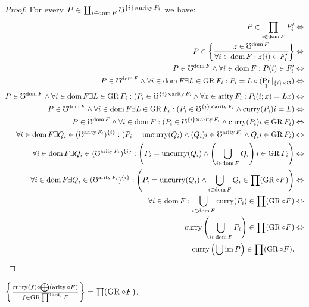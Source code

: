 \begin{proof}
For every $P\in\coprod_{i\in\operatorname{dom} F}\mho^{\{i\}\times\operatorname{arity} F_{i}}$
we have:
\begin{align*}
P\in\prod_{i\in\operatorname{dom} F}F'_{i} & \Leftrightarrow\\
P\in\left\{ \frac{z\in\mho^{\operatorname{dom} F}}{\forall i\in\operatorname{dom} F:z(i)\in F'_{i}}\right\} & \Leftrightarrow\\
P\in\mho^{\operatorname{dom} F}\land\forall i\in\operatorname{dom} F:P(i)\in F'_{i} & \Leftrightarrow\\
P\in\mho^{\operatorname{dom} F}\land\forall i\in\operatorname{dom} F\exists L\in\operatorname{GR} F_{i}:P_{i}=L\circ(\Pr_{1}|_{\{i\}\times\mho}) & \Leftrightarrow\\
P\in\mho^{\operatorname{dom} F}\land\forall i\in\operatorname{dom} F\exists L\in\operatorname{GR} F_{i}:(P_{i}\in\mho^{\{i\}\times\operatorname{arity} F_{i}}\land\forall x\in\operatorname{arity} F_{i}:P_{i}(i;x)=Lx) & \Leftrightarrow\\
P\in\mho^{\operatorname{dom} F}\land\forall i\in\operatorname{dom} F\exists L\in\operatorname{GR} F_{i}:(P_{i}\in\mho^{\{i\}\times\operatorname{arity} F_{i}}\land\operatorname{curry}(P_{i})i=L) & \Leftrightarrow\\
P\in\mho^{\operatorname{dom} F}\land\forall i\in\operatorname{dom} F:(P_{i}\in\mho^{\{i\}\times\operatorname{arity} F_{i}}\land\operatorname{curry}(P_{i})i\in\operatorname{GR} F_{i}) & \Leftrightarrow\\
\forall i\in\operatorname{dom} F\exists Q_{i}\in(\mho^{\operatorname{arity} F_{i}})^{\{i\}}:(P_{i}=\operatorname{uncurry}(Q_{i})\land(Q_{i})i\in\mho^{\operatorname{arity} F_{i}}\land Q_{i}i\in\operatorname{GR} F_{i}) & \Leftrightarrow\\
\forall i\in\operatorname{dom} F\exists Q_{i}\in(\mho^{\operatorname{arity} F_{i}})^{\{i\}}:\left(P_{i}=\operatorname{uncurry}(Q_{i})\land\left(\bigcup_{i\in\operatorname{dom} F}Q_{i}\right)i\in\operatorname{GR} F_{i}\right) & \Leftrightarrow\\
\forall i\in\operatorname{dom} F\exists Q_{i}\in(\mho^{\operatorname{arity} F_{i}})^{\{i\}}:\left(P_{i}=\operatorname{uncurry}(Q_{i})\land\bigcup_{i\in\operatorname{dom} F}Q_{i}\in\prod(\operatorname{GR}\circ F)\right) & \Leftrightarrow\\
\forall i\in\operatorname{dom} F:\bigcup_{i\in\operatorname{dom} F}\operatorname{curry}(P_{i})\in\prod(\operatorname{GR}\circ F) & \Leftrightarrow\\
\operatorname{curry}\left(\bigcup_{i\in\operatorname{dom} F}P_{i}\right)\in\prod(\operatorname{GR}\circ F) & \Leftrightarrow\\
\operatorname{curry}\left(\bigcup\operatorname{im} P\right)\in\prod(\operatorname{GR}\circ F).
\end{align*}
\end{proof}
\begin{lem}
$\left\{ \frac{\operatorname{curry}(f)\circ\bigoplus(\operatorname{arity}\circ F)}{f\in\operatorname{GR}\prod^{\mathrm{(ord)}}F}\right\}=\prod(\operatorname{GR}\circ F)$.\end{lem}

